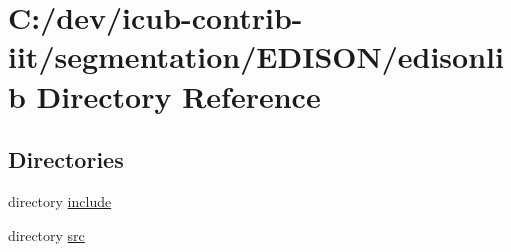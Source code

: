\section{C\+:/dev/icub-\/contrib-\/iit/segmentation/\+E\+D\+I\+S\+O\+N/edisonlib Directory Reference}
\label{dir_b3e20ad17b9697671cdbe91937eda888}
\subsection*{Directories}
\begin{DoxyCompactItemize}
\item 
directory \hyperlink{dir_023feb6d45b0447fa5ba95b60f5d57f5}{include}
\item 
directory \hyperlink{dir_4e515d1d9f97f297dc161aad76a24e4c}{src}
\end{DoxyCompactItemize}

